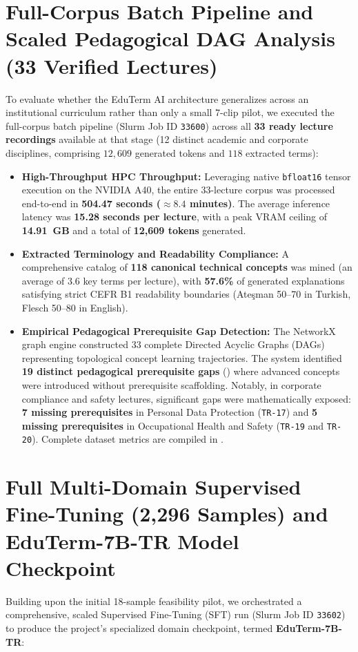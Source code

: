 \documentclass[a4paper,12pt]{report}
\begin{document}
\section{Full-Corpus Batch Pipeline and Scaled Pedagogical DAG Analysis (33 Verified Lectures)}
To evaluate whether the EduTerm AI architecture generalizes across an institutional curriculum rather than only a small 7-clip pilot, we executed the full-corpus batch pipeline (Slurm Job ID \texttt{33600}) across all \textbf{33 ready lecture recordings} available at that stage (12 distinct academic and corporate disciplines, comprising $12{,}609$ generated tokens and $118$ extracted terms):

\begin{itemize}
    \item \textbf{High-Throughput HPC Throughput:} Leveraging native \texttt{bfloat16} tensor execution on the NVIDIA A40, the entire 33-lecture corpus was processed end-to-end in \textbf{504.47 seconds ($\approx 8.4$ minutes)}. The average inference latency was \textbf{15.28 seconds per lecture}, with a peak VRAM ceiling of \textbf{14.91~GB} and a total of \textbf{12,609 tokens} generated.
    \item \textbf{Extracted Terminology and Readability Compliance:} A comprehensive catalog of \textbf{118 canonical technical concepts} was mined (an average of $3.6$ key terms per lecture), with \textbf{57.6\%} of generated explanations satisfying strict CEFR B1 readability boundaries (Ate\c{s}man 50--70 in Turkish, Flesch 50--80 in English).
    \item \textbf{Empirical Pedagogical Prerequisite Gap Detection:} The NetworkX graph engine constructed 33 complete Directed Acyclic Graphs (DAGs) representing topological concept learning trajectories. The system identified \textbf{19 distinct pedagogical prerequisite gaps} () where advanced concepts were introduced without prerequisite scaffolding. Notably, in corporate compliance and safety lectures, significant gaps were mathematically exposed: \textbf{7 missing prerequisites} in Personal Data Protection (\texttt{TR-17}) and \textbf{5 missing prerequisites} in Occupational Health and Safety (\texttt{TR-19} and \texttt{TR-20}). Complete dataset metrics are compiled in .
\end{itemize}

\section{Full Multi-Domain Supervised Fine-Tuning (2,296 Samples) and EduTerm-7B-TR Model Checkpoint}
Building upon the initial 18-sample feasibility pilot, we orchestrated a comprehensive, scaled Supervised Fine-Tuning (SFT) run (Slurm Job ID \texttt{33602}) to produce the project's specialized domain checkpoint, termed \textbf{EduTerm-7B-TR}:
\end{document}
